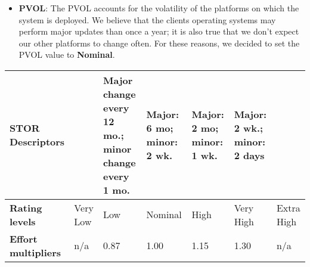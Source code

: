 		
		
		
		\begin{itemize}
			\item \textbf{PVOL}: The PVOL accounts for the volatility of the platforms on which the system is deployed. We believe that the clients operating systems may perform major updates than once a year; it is also true that we don't expect our other platforms to change often. For these reasons, we decided to set the PVOL value to \textbf{Nominal}.
		\end{itemize}
		
		\begin{center}
			\begin{tabular}{ | C{2cm} | C{2cm} | C{2cm} | C{2cm} | C{2cm} | C{2cm} | C{2cm} | }
				\hline
				\textbf{STOR Descriptors} & & Major change every 12 mo.; minor change every 1 mo. & Major: 6 mo; minor: 2 wk. & Major: 2 mo; minor: 1 wk. & Major: 2 wk.; minor: 2 days & \\ \hline
			
				\textbf{Rating levels} & Very Low & Low & Nominal & High & Very High & Extra High\\ \hline
			
				\textbf{Effort multipliers} & n/a & 0.87 & 1.00 & 1.15 & 1.30 & n/a\\ \hline
			\end{tabular}
		\end{center}